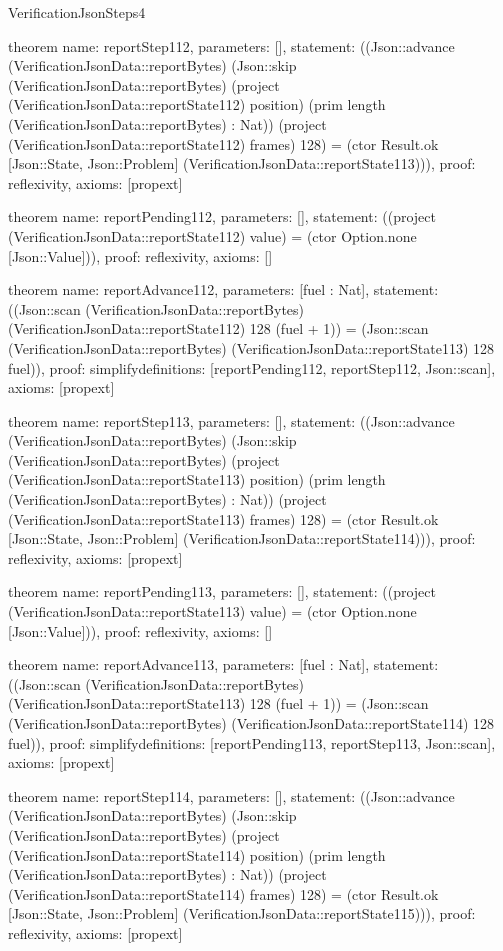 \begin{lexlean}{VerificationJsonSteps4}
\begin{semanticmodule}
theorem{
  name: reportStep112,
  parameters: [],
  statement: ((Json::advance (VerificationJsonData::reportBytes) (Json::skip (VerificationJsonData::reportBytes) (project (VerificationJsonData::reportState112) position) (prim length (VerificationJsonData::reportBytes) : Nat)) (project (VerificationJsonData::reportState112) frames) 128) = (ctor Result.ok [Json::State, Json::Problem] (VerificationJsonData::reportState113))),
  proof: reflexivity{},
  axioms: [propext]
}

theorem{
  name: reportPending112,
  parameters: [],
  statement: ((project (VerificationJsonData::reportState112) value) = (ctor Option.none [Json::Value])),
  proof: reflexivity{},
  axioms: []
}

theorem{
  name: reportAdvance112,
  parameters: [fuel : Nat],
  statement: ((Json::scan (VerificationJsonData::reportBytes) (VerificationJsonData::reportState112) 128 (fuel + 1)) = (Json::scan (VerificationJsonData::reportBytes) (VerificationJsonData::reportState113) 128 fuel)),
  proof: simplify{definitions: [reportPending112, reportStep112, Json::scan]},
  axioms: [propext]
}

theorem{
  name: reportStep113,
  parameters: [],
  statement: ((Json::advance (VerificationJsonData::reportBytes) (Json::skip (VerificationJsonData::reportBytes) (project (VerificationJsonData::reportState113) position) (prim length (VerificationJsonData::reportBytes) : Nat)) (project (VerificationJsonData::reportState113) frames) 128) = (ctor Result.ok [Json::State, Json::Problem] (VerificationJsonData::reportState114))),
  proof: reflexivity{},
  axioms: [propext]
}

theorem{
  name: reportPending113,
  parameters: [],
  statement: ((project (VerificationJsonData::reportState113) value) = (ctor Option.none [Json::Value])),
  proof: reflexivity{},
  axioms: []
}

theorem{
  name: reportAdvance113,
  parameters: [fuel : Nat],
  statement: ((Json::scan (VerificationJsonData::reportBytes) (VerificationJsonData::reportState113) 128 (fuel + 1)) = (Json::scan (VerificationJsonData::reportBytes) (VerificationJsonData::reportState114) 128 fuel)),
  proof: simplify{definitions: [reportPending113, reportStep113, Json::scan]},
  axioms: [propext]
}

theorem{
  name: reportStep114,
  parameters: [],
  statement: ((Json::advance (VerificationJsonData::reportBytes) (Json::skip (VerificationJsonData::reportBytes) (project (VerificationJsonData::reportState114) position) (prim length (VerificationJsonData::reportBytes) : Nat)) (project (VerificationJsonData::reportState114) frames) 128) = (ctor Result.ok [Json::State, Json::Problem] (VerificationJsonData::reportState115))),
  proof: reflexivity{},
  axioms: [propext]
}


\end{semanticmodule}
\end{lexlean}
